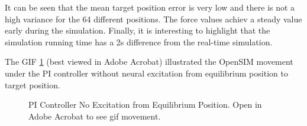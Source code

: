 It can be seen that the mean target position error is very low and there is not a high variance for the 64 different positions. The force values  achiev a steady value early during the simulation. Finally, it is interesting to highlight that the simulation running time has a 2s difference from the real-time simulation. 

The GIF \ref{gif:PICONTROLLER2} (best viewed in Adobe Acrobat) illustrated the OpenSIM movement under the PI controller without neural excitation from equilibrium position to target position. 


\begin{figure}[h!]
    \centering
    \caption{PI Controller No Excitation from Equilibrium Position. Open in Adobe Acrobat to see gif movement.}
    \label{gif:PICONTROLLER2}

\end{figure}

\newpage
